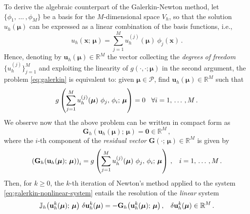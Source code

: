 \documentclass[12pt, a4paper, twoside, openright, notitlepage]{report}
\numberwithin{equation}{chapter}
\theoremstyle{theorem}
\theoremstyle{definition}
\theoremstyle{remark}
\theoremstyle{proposition}
\numberwithin{figure}{chapter}
\newcommand{\bg}[1]{\boldsymbol{#1}}
\begin{document}
		To derive the algebraic counterpart of the Galerkin-Newton method, let $\big\lbrace \phi_1, \, \ldots \, , \phi_M \big\rbrace$ be a basis for the $M$-dimensional space $V_h$, so that the solution $u_h(\bg{\mu})$ can be expressed as a linear combination of the basis functions, i.e.,
		\begin{equation}
			\label{eq:galerkin-solution}
			u_h(\bg{x}; \, \bg{\mu}) = \sum_{j = 1}^M u_h^{(j)}(\bg{\mu}) ~ \phi_j(\bg{x}) \, .
		\end{equation} 
		Hence, denoting by $\mathbf{u}_h(\bg{\mu}) \in \mathbb{R}^M$ the vector collecting the \emph{degrees} \emph{of} \emph{freedom} $\big\lbrace u_h^{(j)} \big\rbrace_{j = 1}^M$ and exploiting the linearity of $g(\cdot,\cdot; \bg{\mu})$ in the second argument, the problem \eqref{eq:galerkin} is equivalent to: given $\bg{\mu} \in \mathcal{P}$, find $\mathbf{u}_h(\bg{\mu}) \in \mathbb{R}^M$ such that
		\begin{equation*}
			\label{eq:galerkin-algebraic}
			g \left( \sum_{j = 1}^M u_h^{(j)}(\bg{\mu}) ~ \phi_j, \, \phi_i; \, \bg{\mu} \right) = 0 \hspace*{0.3cm} \forall i = 1, \, \ldots \, , M \, .
		\end{equation*}
		We observe now that the above problem can be written in compact form as
		\begin{equation}
			\label{eq:galerkin-nonlinear-system}
			\mathbf{G}_h (\mathbf{u}_h(\bg{\mu}); \, \bg{\mu}) = \bg{0} \in \mathbb{R}^M \, ,
		\end{equation}
		where the $i$-th component of the \emph{residual vector} $\mathbf{G}(\cdot; \, \bg{\mu}) \in \mathbb{R}^M$ is given by
		\begin{equation}
			\label{eq:galerkin-nonlinear-system-equation}
			\left( \mathbf{G}_h(\mathbf{u}_h(\bg{\mu}); \, \bg{\mu}) \right)_i = g \left( \sum_{j = 1}^M u_h^{(j)}(\bg{\mu}) ~ \phi_j, \, \phi_i; \, \bg{\mu} \right) \, , \hspace*{0.3cm} i = 1, \, \ldots \, , M \, .
		\end{equation}
		Then, for $k \geq 0$, the $k$-th iteration of Newton's method applied to the system \eqref{eq:galerkin-nonlinear-system} entails the resolution of the \emph{linear} system
		\begin{equation}
			\label{eq:galerkin-linear-system}
			\mathbb{J}_h \big( \mathbf{u}^k_h(\bg{\mu}); \, \bg{\mu} \big) ~ \delta \mathbf{u}^k_h(\bg{\mu}) = - \mathbf{G}_h \big( \mathbf{u}^k_h(\bg{\mu}); \, \bg{\mu} \big) \, , \hspace*{0.3cm} \delta \mathbf{u}^k_h(\bg{\mu}) \in \mathbb{R}^M \, .
		\end{equation}
\end{document}
